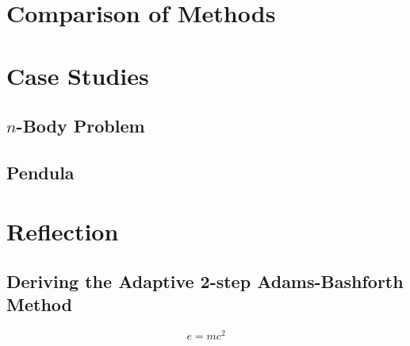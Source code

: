 \documentclass[12pt, twoside]{report}
\theoremstyle{plain}
\theoremstyle{definition}
\theoremstyle{definition}
\begin{document}
\chapter{Comparison of Methods}
\label{4_comparison}
    
\chapter{Case Studies}
\label{5_case_studies}
    \section{$n$-Body Problem}
    \label{5_nbody}

    \section{Pendula}
    \label{pendula}

\chapter{Reflection}
\label{6_reflection}




\clearpage
\section{Deriving the Adaptive 2-step Adams-Bashforth Method}
    \begin{equation}
        e=mc^2
    \end{equation}
\end{document}
